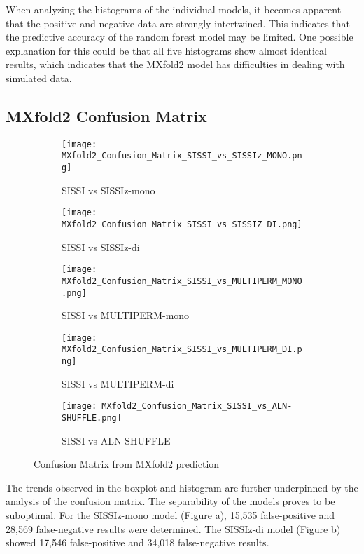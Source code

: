 \documentclass{article}
\begin{document}
\begin{large}
\begin{large}
\begin{large}
When analyzing the histograms of the individual models, it becomes apparent that the positive and negative data are strongly intertwined. This indicates that the predictive accuracy of the random forest model may be limited. One possible explanation for this could be that all five histograms show almost identical results, which indicates that the MXfold2 model has difficulties in dealing with simulated data.

\subsection{MXfold2 Confusion Matrix}

\begin{figure}[H]
    \centering
    \begin{subfigure}[b]{0.48\textwidth}
        \texttt{[image: MXfold2\_Confusion\_Matrix\_SISSI\_vs\_SISSIz\_MONO.png]}
        \caption{SISSI vs SISSIz-mono}
    \end{subfigure}
    \hfill
    \begin{subfigure}[b]{0.48\textwidth}
        \texttt{[image: MXfold2\_Confusion\_Matrix\_SISSI\_vs\_SISSIZ\_DI.png]}
        \caption{SISSI vs SISSIz-di}
    \end{subfigure}
    \vspace{1em}
    
    \begin{subfigure}[b]{0.48\textwidth}
        \texttt{[image: MXfold2\_Confusion\_Matrix\_SISSI\_vs\_MULTIPERM\_MONO.png]}
        \caption{SISSI vs MULTIPERM-mono}
    \end{subfigure}
    \hfill
    \begin{subfigure}[b]{0.48\textwidth}
        \texttt{[image: MXfold2\_Confusion\_Matrix\_SISSI\_vs\_MULTIPERM\_DI.png]}
        \caption{SISSI vs MULTIPERM-di}
    \end{subfigure}
    \vspace{1em}
    
    \begin{subfigure}[b]{0.48\textwidth}
        \texttt{[image: MXfold2\_Confusion\_Matrix\_SISSI\_vs\_ALN-SHUFFLE.png]}
        \caption{SISSI vs ALN-SHUFFLE}
    \end{subfigure}

    \caption{Confusion Matrix from MXfold2 prediction}
\end{figure}

The trends observed in the boxplot and histogram are further underpinned by the analysis of the confusion matrix. The separability of the models proves to be suboptimal. For the SISSIz-mono model (Figure a), 15,535 false-positive and 28,569 false-negative results were determined. The SISSIz-di model (Figure b) showed 17,546 false-positive and 34,018 false-negative results. \vspace{1em}    


\end{large}
\end{large}
\end{large}
\end{document}
